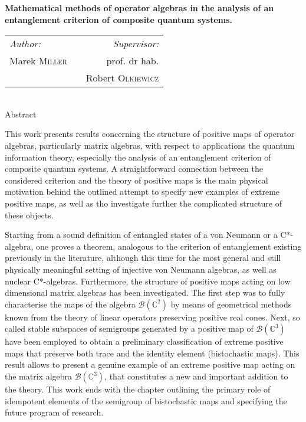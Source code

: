 \thispagestyle{empty}

\begin{center}
{ \large \bfseries
    Mathematical methods of operator algebras
    in the analysis of an entanglement criterion
    of composite quantum systems.
}\\[1.5cm]

{
\begin{tabular}{lcr}
\emph{Author:} & \hspace{3cm} & \emph{Supervisor:}\\
Marek \textsc{Miller} & & prof. dr hab. \\
    & & Robert \textsc{Olkiewicz}
\end{tabular}
}
\\[1cm]
Abstract\\[0.5cm]
\end{center}

{
This work presents results concerning the structure of
positive maps of operator algebras, particularly matrix algebras,
with respect to applications the quantum information theory,
especially the analysis of an entanglement criterion of composite
quantum systems.
A straightforward connection between the considered criterion
and the theory of positive maps is the main physical motivation
behind the outlined attempt to specify new examples of extreme
positive maps, as well as tho investigate further the complicated
structure of these objects.

Starting from a sound definition of entangled states of a von Neumann
or a C*-algebra,
one proves a theorem, analogous to the criterion of entanglement
existing previously in the literature,
although this time for the most general and still physically meaningful
setting of injective von Neumann algebras,
as well as nuclear C*-algebras.
Furthermore, the structure of positive maps acting on low dimensional
matrix algebras has been investigated.
The first step was to fully characterise the maps of the algebra
$\mathcal{B}(\mathbb{C}^{2})$ by means of geometrical methods known
from the theory of linear operators preserving positive real cones.
Next, so called stable subspaces of semigroups generated by a positive map
of $\mathcal{B}(\mathbb{C}^{3})$ have been employed
to obtain a preliminary classification of extreme positive maps
that preserve both trace and the identity element (bistochastic maps).
This result allows to present a genuine example of an extreme positive
map acting on the matrix algebra $\mathcal{B}(\mathbb{C}^{3})$,
that constitutes a new and important addition to the theory.
This work ends with the chapter outlining the primary role of
idempotent elements of the semigroup of bistochastic maps
and specifying the future program of research.
}
\vfill
